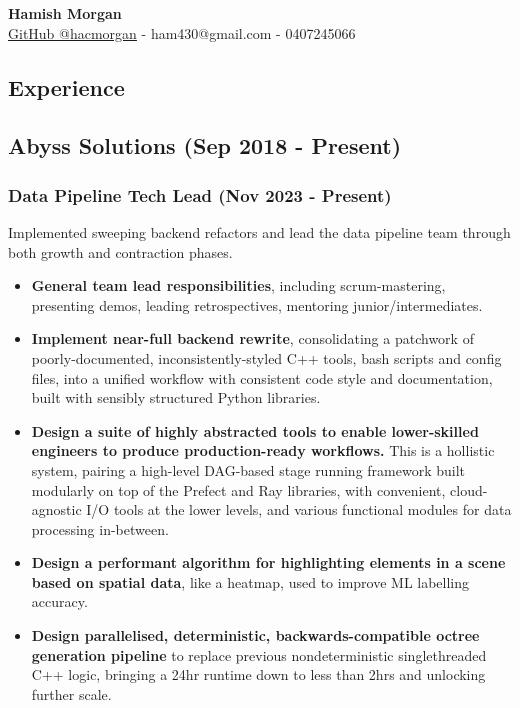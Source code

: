 \documentclass[12pt]{article}
\begin{document}
\begin{center}
  \Large
  \vspace{0.8cm}
  \textbf{Hamish Morgan}\\
  \vspace{0.8cm}
  \large
  \href{https://github.com/hacmorgan}{GitHub @hacmorgan} - ham430@gmail.com - 0407245066

\end{center}


\begin{FlushLeft}

  \section{Experience}

  \subsection{Abyss Solutions (Sep 2018 - Present)}

  \subsubsection{Data Pipeline Tech Lead (Nov 2023 - Present)}
  Implemented sweeping backend refactors and lead the data pipeline team through both growth and contraction phases. \\

  \begin{itemize}
  \item \textbf{General team lead responsibilities}, including scrum-mastering, presenting demos, leading retrospectives, mentoring junior/intermediates. \\
  \item \textbf{Implement near-full backend rewrite}, consolidating a patchwork of poorly-documented, inconsistently-styled C++ tools, bash scripts and config files, into a unified workflow with consistent code style and documentation, built with sensibly structured Python libraries. \\
  \item \textbf{Design a suite of highly abstracted tools to enable lower-skilled engineers to produce production-ready workflows.} This is a hollistic system, pairing a high-level DAG-based stage running framework built modularly on top of the Prefect and Ray libraries, with convenient, cloud-agnostic I/O tools at the lower levels, and various functional modules for data processing in-between. \\
  \item \textbf{Design a performant algorithm for highlighting elements in a scene based on spatial data}, like a heatmap, used to improve ML labelling accuracy. \\
  \item \textbf{Design parallelised, deterministic, backwards-compatible octree generation pipeline} to replace previous nondeterministic singlethreaded C++ logic, bringing a 24hr runtime down to less than 2hrs and unlocking further scale. \\
  \end{itemize}


\end{FlushLeft}
\end{document}
